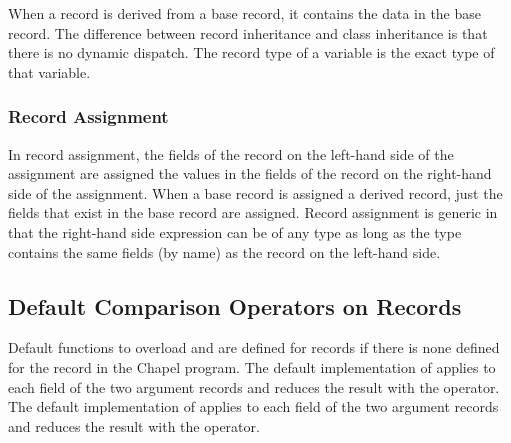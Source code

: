 When a record is derived from a base record, it contains the data in
the base record.  The difference between record inheritance and class
inheritance is that there is no dynamic dispatch.  The record type of
a variable is the exact type of that variable.

\subsubsection{Record Assignment}
\label{Record_Assignment}

In record assignment, the fields of the record on the left-hand side
of the assignment are assigned the values in the fields of the record
on the right-hand side of the assignment.  When a base record is
assigned a derived record, just the fields that exist in the base
record are assigned.  Record assignment is generic in that the
right-hand side expression can be of any type as long as the type
contains the same fields (by name) as the record on the left-hand
side.

\subsection{Default Comparison Operators on Records}
\label{Record_Comparison_Operators}

Default functions to overload \chpl{==} and \chpl{\!=} are defined for
records if there is none defined for the record in the Chapel program.
The default implementation of \chpl{==} applies \chpl{==} to each
field of the two argument records and reduces the result with
the \chpl{&&} operator.  The default implementation of \chpl{\!=}
applies \chpl{\!=} to each field of the two argument records and
reduces the result with the \chpl{||} operator.
